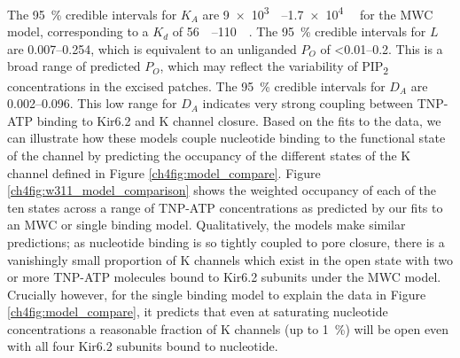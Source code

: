 The \SI{95}{\percent} credible intervals for $K_A$ are \SIrange{9e3}{1.7e4}{\per\Molar} for the MWC model, corresponding to a $K_d$ of \SIrange{56}{110}{\micro\Molar}.
The \SI{95}{\percent} credible intervals for $L$ are \numrange{.007}{.254}, which is equivalent to an unliganded $P_O$ of \numrange{<0.01}{0.2}.
This is a broad range of predicted $P_O$, which may reflect the variability of PIP\textsubscript{2} concentrations in the excised patches.
The \SI{95}{\percent} credible intervals for $D_A$ are \numrange{.002}{.096}.
This low range for $D_A$ indicates very strong coupling between TNP-ATP binding to Kir6.2 and K\ATP{} channel closure.
Based on the fits to the data, we can illustrate how these models couple nucleotide binding to the functional state of the channel by predicting the occupancy of the different states of the K\ATP{} channel defined in Figure \ref{ch4fig:model_compare}.
Figure \ref{ch4fig:w311_model_comparison} shows the weighted occupancy of each of the ten states across a range of TNP-ATP concentrations as predicted by our fits to an MWC or single binding model.
Qualitatively, the models make similar predictions; as nucleotide binding is so tightly coupled to pore closure, there is a vanishingly small proportion of K\ATP{} channels which exist in the open state with two or more TNP-ATP molecules bound to Kir6.2 subunits under the MWC model.
Crucially however, for the single binding model to explain the data in Figure \ref{ch4fig:model_compare}, it predicts that even at saturating nucleotide concentrations a reasonable fraction of K\ATP{} channels (up to \SI{1}{\percent}) will be open even with all four Kir6.2 subunits bound to nucleotide.

